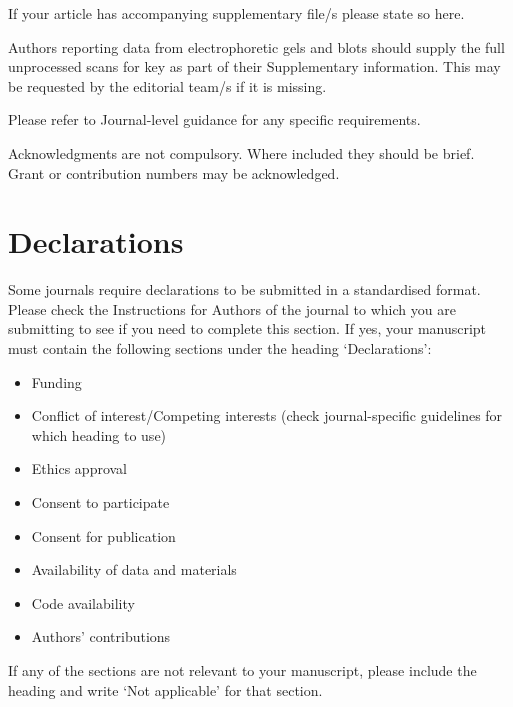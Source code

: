 \documentclass[default,pdflatex,iicol]{sn-jnl}%
\begin{document}
\backmatter


If your article has accompanying supplementary file/s please state so here. 

Authors reporting data from electrophoretic gels and blots should supply the full unprocessed scans for key as part of their Supplementary information. This may be requested by the editorial team/s if it is missing.

Please refer to Journal-level guidance for any specific requirements.


Acknowledgments are not compulsory. Where included they should be brief. Grant or contribution numbers may be acknowledged.

\section*{Declarations}

Some journals require declarations to be submitted in a standardised format. Please check the Instructions for Authors of the journal to which you are submitting to see if you need to complete this section. If yes, your manuscript must contain the following sections under the heading `Declarations':

\begin{itemize}
\item Funding
\item Conflict of interest/Competing interests (check journal-specific guidelines for which heading to use)
\item Ethics approval 
\item Consent to participate
\item Consent for publication
\item Availability of data and materials
\item Code availability 
\item Authors' contributions
\end{itemize}

\noindent
If any of the sections are not relevant to your manuscript, please include the heading and write `Not applicable' for that section. 



\end{document}
